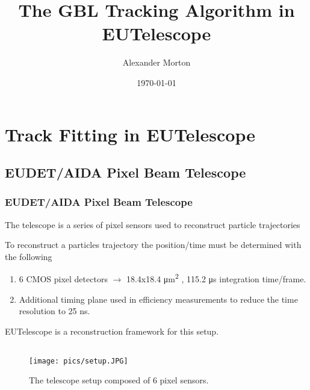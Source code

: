 \documentclass{beamer}
\title[EUTelescope and GBL]{The GBL Tracking Algorithm in EUTelescope} %
\author{Alexander Morton} %
\institute[Glasgow] %
{
University of Glasgow \\ %
\medskip
\textit{a.morton.2@research.com} %
}
\date{\today} %
\begin{document}
\begin{frame}
\titlepage %
\end{frame}




\section{Track Fitting in EUTelescope}
\subsection{EUDET/AIDA Pixel Beam Telescope}
\begin{frame}
\frametitle{EUDET/AIDA Pixel Beam Telescope}
\begin{itemize}
\small{
\item The telescope is a series of pixel sensors used to reconstruct particle trajectories
\item To reconstruct a particles trajectory the position/time must be determined with the following 
\begin{enumerate}
\item  6 CMOS pixel detectors $\rightarrow$ 18.4x18.4 \si{\micro\metre\squared}  , 115.2 \si{\micro\second} integration time/frame.
\item Additional timing plane used in efficiency measurements to reduce the time resolution to 25 ns.
\end{enumerate}
\item EUTelescope is a reconstruction framework for this setup.
}
\end{itemize}
\begin{figure}
  \begin{columns}
        \texttt{[image: pics/setup.JPG]}
        \label{fig:example left}
        \caption{The telescope setup composed of 6 pixel sensors. }
      \end{columns}
\end{figure}
\end{frame}
\end{document}
